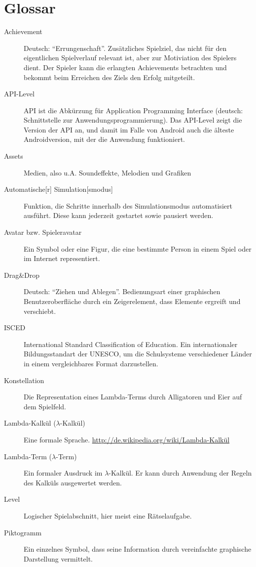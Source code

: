 \section{Glossar}
\begin{description}
	\item[Achievement] Deutsch: "`Errungenschaft"'. Zusätzliches Spielziel, das nicht für den eigentlichen Spielverlauf relevant ist, aber zur Motiviation des Spielers dient.
		Der Spieler kann die erlangten Achievements betrachten und bekommt beim Erreichen des Ziels den Erfolg mitgeteilt.
	\item[API-Level] API ist die Abkürzung für Application Programming Interface (deutsch: Schnittstelle zur Anwendungsprogrammierung).
	Das API-Level zeigt die Version der API an, und damit im Falle von Android auch die älteste Androidversion, mit der die Anwendung funktioniert.
	\item[Assets] Medien, also u.A. Soundeffekte, Melodien und Grafiken
	\item[Automatische{[}r{]} Simulation{[}smodus{]}] Funktion, die Schritte innerhalb des Simulationsmodus automatisiert ausführt. Diese kann jederzeit gestartet sowie pausiert werden.
	\item [Avatar bzw. Spieleravatar] Ein Symbol oder eine Figur, die eine bestimmte Person in einem Spiel oder im Internet representiert.
	\item [Drag\&Drop] Deutsch: "`Ziehen und Ablegen"'. Bedienungsart  einer graphischen Benutzeroberfläche durch ein Zeigerelement, dass Elemente ergreift und verschiebt.
	\item [ISCED] International Standard Classification of Education. Ein internationaler Bildungsstandart der UNESCO, um die Schulsysteme verschiedener Länder in einem vergleichbares Format darzustellen.
	\item [Konstellation] Die Representation eines Lambda-Terms durch Alligatoren und Eier auf dem Spielfeld.
	\item[Lambda-Kalkül (\(\lambda\)-Kalkül)] Eine formale Sprache. \url{http://de.wikipedia.org/wiki/Lambda-Kalkül}
	\item[Lambda-Term (\(\lambda\)-Term)] Ein formaler Ausdruck im \(\lambda\)-Kalkül.
		Er kann durch Anwendung der Regeln des Kalküls ausgewertet werden.
	\item[Level] Logischer Spielabschnitt, hier meist eine Rätselaufgabe.
	\item [Piktogramm] Ein einzelnes Symbol, dass seine Information durch vereinfachte graphische Darstellung vermittelt.

\end{description}
